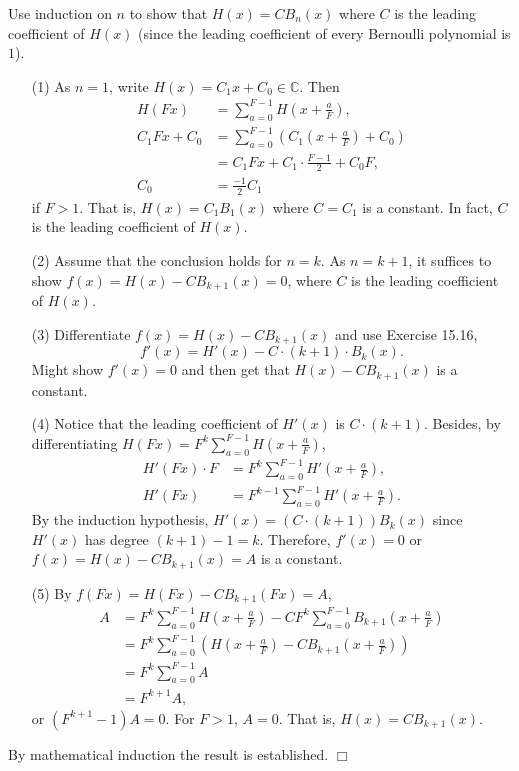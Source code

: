 \documentclass{article}
\begin{document}
Use induction on $n$ to show that $H(x) = CB_n(x)$
where $C$ is the leading coefficient of $H(x)$
(since the leading coefficient of every Bernoulli polynomial is $1$).

\begin{enumerate}
\item[(1)]
As $n = 1$, write $H(x) = C_1 x + C_0 \in \mathbb{C}$.
Then
\begin{align*}
H(Fx)
&= \sum_{a=0}^{F-1} H(x+\frac{a}{F}), \\
C_1 F x + C_0
&= \sum_{a=0}^{F-1} \left( C_1\left(x+\frac{a}{F}\right) + C_0\right) \\
&= C_1Fx + C_1 \cdot \frac{F-1}{2} + C_0F, \\
C_0 &= \frac{-1}{2} C_1
\end{align*}
if $F > 1$. That is, $H(x) = C_1 B_1(x)$ where $C = C_1$ is a constant.
In fact, $C$ is the leading coefficient of $H(x)$.
\item[(2)]
Assume that the conclusion holds for $n = k$.
As $n = k+1$, it suffices to show $f(x) = H(x) - CB_{k+1}(x) = 0$,
where $C$ is the leading coefficient of $H(x)$.
\item[(3)]
Differentiate $f(x) = H(x) - CB_{k+1}(x)$ and use Exercise 15.16,
$$f'(x) = H'(x) - C \cdot (k+1) \cdot B_k(x).$$
Might show $f'(x) = 0$ and then get that $H(x) - CB_{k+1}(x)$ is a constant.
\item[(4)]
Notice that the leading coefficient of $H'(x)$ is $C \cdot (k+1)$.
Besides, by differentiating $H(Fx) = F^{k}\sum_{a=0}^{F-1}H(x+\frac{a}{F})$,
\begin{align*}
H'(Fx) \cdot F
&= F^{k} \sum_{a=0}^{F-1} H'(x+\frac{a}{F}), \\
H'(Fx)
&= F^{k-1} \sum_{a=0}^{F-1} H'(x+\frac{a}{F}).
\end{align*}
By the induction hypothesis,
$H'(x) = (C \cdot (k+1)) B_k(x)$ since $H'(x)$ has degree $(k+1)-1 = k$.
Therefore, $f'(x) = 0$ or $f(x) = H(x) - CB_{k+1}(x) = A$ is a constant.
\item[(5)]
By $f(Fx) = H(Fx) - CB_{k+1}(Fx) = A$,
\begin{align*}
A
&= F^{k} \sum_{a=0}^{F-1} H \left( x+\frac{a}{F} \right)
- C F^{k} \sum_{a=0}^{F-1} B_{k+1} \left( x+\frac{a}{F} \right) \\
&= F^{k} \sum_{a=0}^{F-1} \left( H \left( x+\frac{a}{F} \right)
- C B_{k+1} \left( x+\frac{a}{F} \right) \right) \\
&= F^{k} \sum_{a=0}^{F-1} A \\
&= F^{k+1} A,
\end{align*}
or $(F^{k+1} - 1) A = 0$. For $F > 1$, $A = 0$.
That is, $H(x) = CB_{k+1}(x)$.
\end{enumerate}
By mathematical induction the result is established.
$\Box$ \\\\
\end{document}
